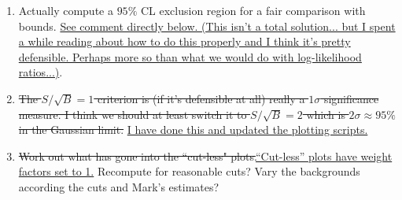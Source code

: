\documentclass[11pt, a4paper]{article}
\newcommand{\newtext}[2]{\textcolor{#1}{\ul{#2}}}
\begin{document}
\begin{enumerate}





\item Actually compute a $95\%$ CL exclusion region for a fair comparison with
bounds. \newtext{PB}{See comment directly below. (This isn't a total
solution... but I spent a while reading about how to do this properly and I
think it's pretty defensible. Perhaps more so than what we would do with
log-likelihood ratios...)}.

\item \sout{The $S/\sqrt{B} =1$ criterion is (if it's defensible at all) really a
$1\sigma$ significance measure. I think we should at least switch it to
$S/\sqrt{B} =2$ which is $2\sigma\approx 95\%$ in the Gaussian limit.}
\newtext{PB}{I have done this and updated the plotting scripts.}

\item \sout{Work out what has gone into the ``cut-less"
plots.}\newtext{PB}{``Cut-less'' plots have weight factors set to 1.} Recompute
for reasonable cuts? Vary the backgrounds according the cuts and Mark's
estimates?



\end{enumerate}
\end{document}
